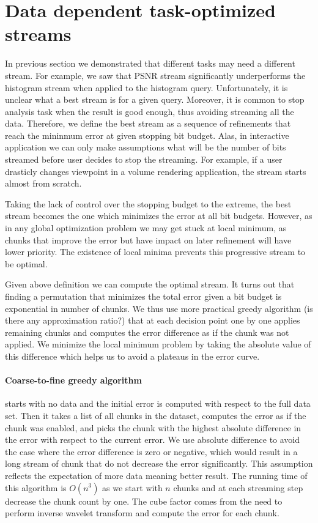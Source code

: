 \section{Data dependent task-optimized streams}

In previous section we demonstrated that different tasks may need a different stream. For example, we saw
that PSNR stream significantly underperforms the histogram stream when applied to the histogram query.
Unfortunately, it is unclear what a best stream is for a given query. Moreover, it is common to stop analysis
task when the result is good enough, thus avoiding streaming all the data. Therefore, we define the best stream as
a sequence of refinements that reach the mininmum error at given stopping bit budget. Alas, in interactive application
we can only make assumptions what will be the number of bits streamed before user decides to stop the streaming. For
example, if a user drasticly changes viewpoint in a volume rendering application, the stream starts almost from scratch.

Taking the lack of control over the stopping budget to the extreme, the best stream becomes the one which minimizes
the error at all bit budgets. However, as in any global optimization problem we may get stuck at local minimum, as
chunks that improve the error but have impact on later refinement will have lower priority. The existence of local
minima prevents this progressive stream to be optimal.

Given above definition we can compute the optimal stream. It turns out that finding a permutation that minimizes
the total error given a bit budget is exponential in number of chunks. We thus use more practical greedy algorithm (is there
any approximation ratio?) that at each decision point one by one applies remaining chunks and computes the error
difference as if the chunk was not applied. We minimize the local minimum problem by taking the absolute value
of this difference which helps us to avoid a plateaus in the error curve.

\paragraph*{Coarse-to-fine greedy algorithm} starts with no data and the initial error is computed with respect
to the full data set. Then it takes a list of all chunks in the dataset, computes the error as if the chunk was
enabled, and picks the chunk with the highest absolute difference in the error with respect to the current error.
We use absolute difference to avoid the case where the error difference is zero or negative, which would result
in a long stream of chunk that do not decrease the error significantly. This assumption reflects the expectation
of more data meaning better result. The running time of this algorithm is $O(n^3)$ as we start with $n$ chunks
and at each streaming step decrease the chunk count by one. The cube factor comes from the need to perform inverse
wavelet transform and compute the error for each chunk.


